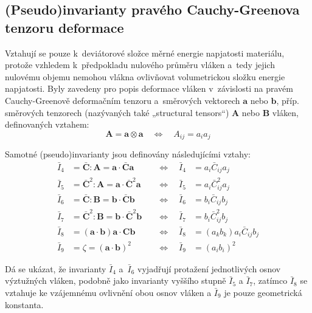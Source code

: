 
\subsection{(Pseudo)invarianty pravého Cauchy-Greenova tenzoru deformace}
Vztahují se pouze k~deviátorové složce měrné energie napjatosti materiálu, protože vzhledem k~předpokladu nulového průměru vláken a~tedy jejich nulovému objemu nemohou vlákna ovlivňovat volumetrickou složku energie napjatosti.
Byly zavedeny pro popis deformace vláken v~závislosti na pravém Cauchy-Greenově deformačním tenzoru a~směrových vektorech $\bm{a}$ nebo $\bm{b}$, příp. směrových tenzorech (nazývaných  také „structural tensors“) $\bm{A}$ nebo $\bm{B}$ vláken, definovaných vztahem:
\begin{equation*}
\bm{A} = \bm{a} \otimes \bm{a}
\quad\Leftrightarrow\quad
A_{ij} = a_i a_j
\end{equation*}

Samotné (pseudo)invarianty jsou definovány následujícími vztahy:
\begin{align*}
\bar{I}_4 &= \bar{\bm{C}} : \bm{A} = \bm{a} \cdot \bar{\bm{C}} \bm{a} \quad&\Leftrightarrow\quad \bar{I}_4 &= a_i \bar{C}_{ij} a_j\\
\bar{I}_5 &= \bar{\bm{C}}^2 : \bm{A} = \bm{a} \cdot \bar{\bm{C}}^2 \bm{a} \quad&\Leftrightarrow\quad \bar{I}_5 &= a_i \bar{C}_{ij}^2 a_j\\
\bar{I}_6 &= \bar{\bm{C}} : \bm{B} = \bm{b} \cdot \bar{\bm{C}} \bm{b} \quad&\Leftrightarrow\quad \bar{I}_6 &= b_i \bar{C}_{ij} b_j\\
\bar{I}_7 &= \bar{\bm{C}}^2 : \bm{B} = \bm{b} \cdot \bar{\bm{C}}^2 \bm{b} \quad&\Leftrightarrow\quad \bar{I}_7 &= b_i \bar{C}_{ij}^2 b_j\\
\bar{I}_8 &= (\bm{a} \cdot \bm{b}) \bm{a} \cdot \bm{C} \bm{b} \quad&\Leftrightarrow\quad \bar{I}_8 &= (a_k b_k) a_i \bar{C}_{ij} b_j\\
\bar{I}_9 &= \zeta = (\bm{a} \cdot \bm{b})^2 \quad&\Leftrightarrow\quad \bar{I}_9 &= (a_i b_i)^2
\end{align*}

Dá se ukázat, že invarianty $\bar{I}_4$ a~$\bar{I}_6$ vyjadřují protažení jednotlivých osnov výztužných vláken, podobně jako invarianty vyššího stupně $\bar{I}_5$ a $\bar{I}_7$, zatímco $\bar{I}_8$ se vztahuje ke vzájemnému ovlivnění obou osnov vláken a $\bar{I}_9$ je pouze geometrická konstanta.
